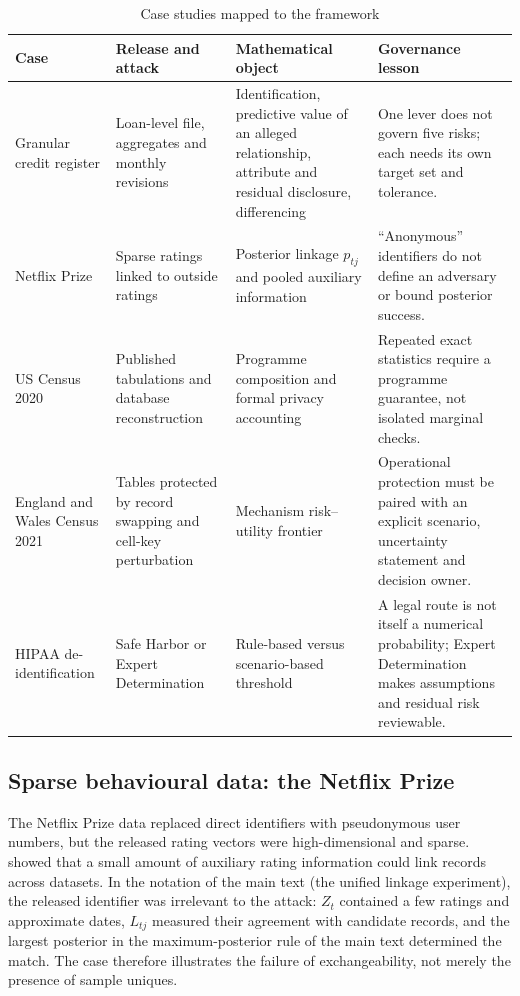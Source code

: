 \documentclass[11pt,a4paper]{article}
\theoremstyle{plain}
\theoremstyle{definition}
\begin{document}
\begin{table}[htbp]
\centering
\caption{Case studies mapped to the framework}
\label{tab:cases}
\small
\begin{tabular}{p{2.7cm}p{3.0cm}p{3.1cm}p{4.1cm}}
\toprule
Case & Release and attack & Mathematical object & Governance lesson \\
\midrule
Granular credit register & Loan-level file, aggregates and monthly revisions &
Identification, predictive value of an alleged relationship, attribute and
residual disclosure, differencing & One lever does not govern five risks; each
needs its own target set and tolerance. \\
Netflix Prize & Sparse ratings linked to outside ratings & Posterior linkage
$p_{tj}$ and pooled auxiliary information & ``Anonymous'' identifiers do not
define an adversary or bound posterior success. \\
US Census 2020 & Published tabulations and database reconstruction & Programme
composition and formal privacy accounting & Repeated exact statistics require
a programme guarantee, not isolated marginal checks. \\
England and Wales Census 2021 & Tables protected by record swapping and cell-key
perturbation & Mechanism risk--utility frontier & Operational protection must be
paired with an explicit scenario, uncertainty statement and decision owner. \\
HIPAA de-identification & Safe Harbor or Expert Determination & Rule-based versus
scenario-based threshold & A legal route is not itself a numerical probability;
Expert Determination makes assumptions and residual risk reviewable. \\
\bottomrule
\end{tabular}
\end{table}

\subsection{Sparse behavioural data: the Netflix Prize}

The Netflix Prize data replaced direct identifiers with pseudonymous user
numbers, but the released rating vectors were high-dimensional and sparse.
\citet{narayanan2008} showed that a small amount of auxiliary rating information
could link records across datasets. In the notation of the main text (the unified linkage experiment), the released identifier was irrelevant to the attack:
$Z_t$ contained a few ratings and approximate dates, $L_{tj}$ measured their
agreement with candidate records, and the largest posterior in
the maximum-posterior rule of the main text determined the match. The case therefore illustrates the
failure of exchangeability, not merely the presence of sample uniques.
\end{document}
